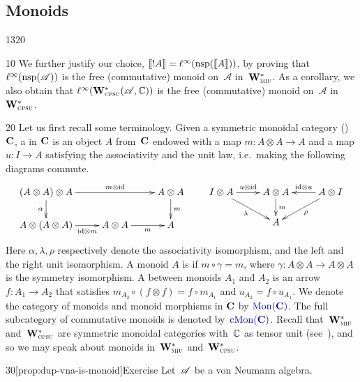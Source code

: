 \subsection{Monoids}
\label{sec:monoids-in-vna}
\begin{parsec}{1320}%
\begin{point}{10}%
We further justify our choice,
$\llbracket!A\rrbracket = \ell^\infty(\mathrm{nsp}(\llbracket A\rrbracket))$,
by proving that $\ell^\infty(\mathrm{nsp}(\mathscr{A}))$
is the free (commutative) monoid on~$\mathscr{A}$ in~$\mathbf{W}^*_{\text{\textsc{miu}}}$.
As a corollary, we also obtain that $\ell^\infty(\mathbf{W}^*_{\text{\textsc{cpsu}}}(\mathscr{A},\mathbb{C}))$
is the free (commutative) monoid on~$\mathscr{A}$
in~$\mathbf{W}^*_{\text{\textsc{cpsu}}}$.
\end{point}
\begin{point}{20}%
Let us first recall some terminology.
Given a symmetric monoidal
	category ()%
$\mathbf{C}$, 
	a  
	in $\mathbf{C}$ is an object $A$ from~$\mathbf{C}$ endowed
with
a  map
$m\colon A\otimes A\to A$
and a  map $u\colon I\to A$
satisfying the associativity and the unit law,
i.e.~making the following diagrams commute.
\[
\xymatrix@R-.5pc{
(A\otimes A)\otimes A
\ar[d]_{\alpha}
\ar[rr]^-{m\otimes \id}
&&
A\otimes A
\ar[d]^{m}
\\
A\otimes (A\otimes A)
\ar[r]_-{\id\otimes m}
&
A\otimes A
\ar[r]_-{m}
&
A
}
\qquad
\xymatrix@R-.5pc{
I\otimes A
\ar[dr]_{\lambda}
\ar[r]^-{u\otimes \id}
&
A\otimes A
\ar[d]^{m}
&
\ar[l]_-{\id\otimes u}
A\otimes I
\ar[dl]^{\rho}
\\
&
A
&
}
\]
Here $\alpha,\lambda,\rho$ respectively
denote the associativity isomorphism, and
the left and the right unit isomorphism.
A monoid $A$ is  if
$m\circ \gamma=m$,
where $\gamma\colon A\otimes A\to A\otimes A$ is the symmetry isomorphism.
A  between monoids $A_1$
and $A_2$ is an arrow $f\colon A_1\to A_2$
that satisfies $m_{A_2}\circ (f\otimes f)=f \circ m_{A_1}$
and $u_{A_2}=f \circ u_{A_1}$.
We denote the category of monoids
and monoid morphisms in $\mathbf{C}$
by $\Define{\Mon(\Cat{C})}$.
The full subcategory of commutative
monoids is denoted by~$\Define{\CMon(\Cat{C})}$.
Recall that~$\mathbf{W}^*_{\text{\textsc{miu}}}$ and~$\mathbf{W}^*_{\text{\textsc{cpsu}}}$
are symmetric monoidal categories
with~$\mathbb{C}$ as tensor unit (see~),
and so we may speak about monoids
in~$\mathbf{W}^*_{\text{\textsc{miu}}}$ and~$\mathbf{W}^*_{\text{\textsc{cpsu}}}$.
\end{point}
\begin{point}{30}[prop:dup-vna-is-monoid]{Exercise}%
Let~$\mathscr{A}$ be a von Neumann algebra.

\end{point}
\end{parsec}
